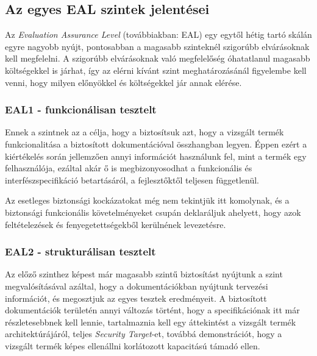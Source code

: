 \subsection{Az egyes EAL szintek jelentései}

Az \emph{Evaluation Assurance Level} (továbbiakban: EAL) egy egytől hétig tartó skálán egyre nagyobb
nyújt, pontosabban a magasabb szinteknél szigorúbb elvárásoknak kell megfelelni. A szigorúbb
elvárásoknak való megfelelőség óhatatlanul magasabb költségekkel is járhat, így az elérni kívánt
szint meghatározásánál figyelembe kell venni, hogy milyen előnyökkel és költségekkel jár annak
elérése.

\subsubsection{EAL1 - funkcionálisan tesztelt}
Ennek a szintnek az a célja, hogy a biztosítsuk azt, hogy a vizsgált termék funkcionalitása
a biztosított dokumentációval összhangban legyen. Éppen ezért a kiértékelés során jellemzően annyi
információt használunk fel, mint a termék egy felhasználója, ezáltal akár ő is megbizonyosodhat
a funkcionális és interfészspecifikáció betartásáról, a fejlesztőktől teljesen függetlenül.

Az esetleges biztonsági kockázatokat még nem tekintjük itt komolynak, és a biztonsági funkcionális
követelményeket csupán deklaráljuk ahelyett, hogy azok feltételezések és fenyegetettségekből
kerülnének levezetésre.

\subsubsection{EAL2 - strukturálisan tesztelt}
Az előző szinthez képest már magasabb szintű biztosítást nyújtunk a szint megvalósításával azáltal,
hogy a dokumentációkban nyújtunk tervezési információt, és megosztjuk az egyes tesztek eredményeit.
A biztosított dokumentációk területén annyi változás történt, hogy a specifikációnak itt már
részletesebbnek kell lennie, tartalmaznia kell egy áttekintést a vizsgált termék architektúrájáról,
teljes \emph{Security Target}-et, továbbá demonstrációt, hogy a vizsgált termék képes ellenállni
korlátozott kapacitású támadó ellen.

